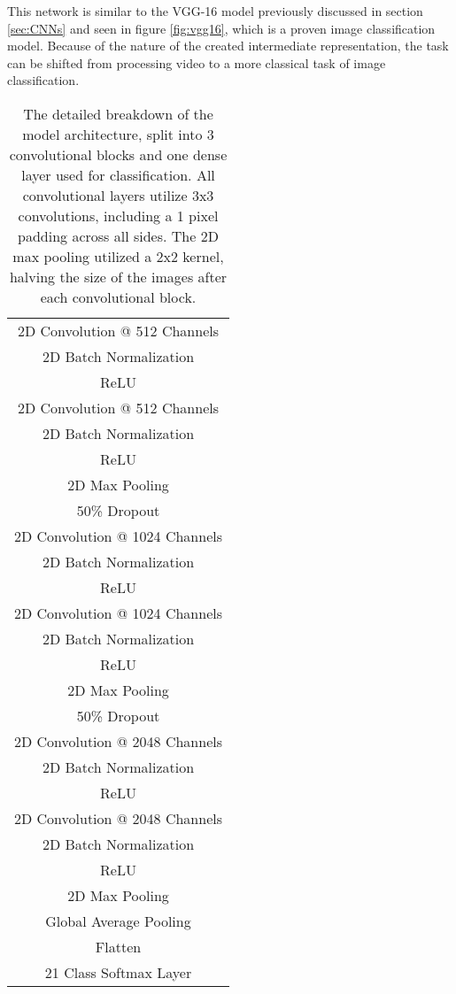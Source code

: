 This network is similar to the VGG-16 model previously discussed in section \ref{sec:CNNs} and seen in figure \ref{fig:vgg16}, which is a proven image classification model. Because of the nature of the created intermediate representation, the task can be shifted from processing video to a more classical task of image classification.

\begin{table}[ht]
	\centering
	\begin{tabular}{||c||}
		\hline
		2D Convolution @ 512 Channels \\
		2D Batch Normalization \\
		ReLU \\
		2D Convolution @ 512 Channels \\
		2D Batch Normalization \\
		ReLU \\
		2D Max Pooling\\
		\hline\hline
		50\% Dropout \\
		2D Convolution @ 1024 Channels \\
		2D Batch Normalization \\
		ReLU \\
		2D Convolution @ 1024 Channels \\
		2D Batch Normalization \\
		ReLU \\
		2D Max Pooling\\
		\hline\hline
		50\% Dropout \\
		2D Convolution @ 2048 Channels \\
		2D Batch Normalization \\
		ReLU \\
		2D Convolution @ 2048 Channels \\
		2D Batch Normalization \\
		ReLU \\
		2D Max Pooling\\
		\hline\hline
		Global Average Pooling \\
		Flatten \\
		21 Class Softmax Layer \\
		\hline
	\end{tabular}
	\caption{The detailed breakdown of the model architecture, split into 3 convolutional blocks and one dense layer used for classification. All convolutional layers utilize 3x3 convolutions, including a 1 pixel padding across all sides. The 2D max pooling utilized a 2x2 kernel, halving the size of the images after each convolutional block.}
	\label{tab:detailed-model}
\end{table}

